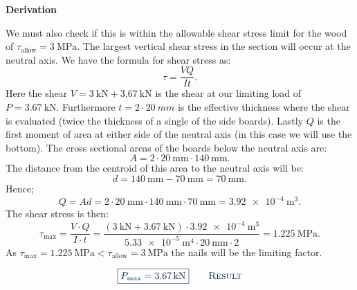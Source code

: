 \documentclass[a4paper]{article}
\numberwithin{equation}{problem}
\newcommand{\AUheading}[1]{%
  \par\vspace{.4\baselineskip}%
  {\sffamily\bfseries\color{AUblueDark}#1\par}%
  \nobreak%
}
\newenvironment{derivation}[1][Derivation]{%
  \AUheading{#1}
  \begingroup\allowdisplaybreaks
  \setlength{\abovedisplayskip}{6pt}%
  \setlength{\belowdisplayskip}{6pt}%
  \setlength{\abovedisplayshortskip}{4pt}%
  \setlength{\belowdisplayshortskip}{4pt}%
}{\par\endgroup\medskip}
\newcommand{\finalresult}[1]{%
  \vspace{.2\baselineskip}%
  \begin{equation}
    {\color{AUblueDark}\boxed{\displaystyle #1}}
    \tag*{\textsc{\textcolor{AUblueDark}{Result}}}
  \end{equation}
  \newpage
}
\begin{document}
\begin{derivation}
  We must also check if this is within the allowable shear stress limit for the wood of $\tau_{\text{allow}} = \qty{3}{\MPa}$.
  The largest vertical shear stress in the section will occur at the neutral axis.
  We have the formula for shear stress as:
  \begin{equation*}
    \tau = \frac{VQ}{I t}
  .\end{equation*}
  Here the shear $V = \qty{3}{\kN} + \qty{3,67}{\kN}$ is the shear at our limiting load of $P = \qty{3,67}{\kN}$.
  Furthermore $t = 2 \cdot \qty{20}{mm} $ is the effective thickness where the shear is evaluated (twice the thickness of a single of the side boards).
  Lastly $Q$ is the first moment of area at either side of the neutral axis (in this case we will use the bottom).
  The cross sectional areas of the boards below the neutral axis are:
  \begin{equation*}
    A = 2 \cdot \qty{20}{\mm} \cdot \qty{140}{\mm}
  .\end{equation*}
  The distance from the centroid of this area to the neutral axis will be:
  \begin{equation*}
    d = \qty{140}{\mm} - \qty{70}{\mm} = \qty{70}{\mm}
  .\end{equation*}
  Hence;
  \begin{equation*}
    Q = A d = 2 \cdot \qty{20}{\mm} \cdot \qty{140}{\mm} \cdot \qty{70}{\mm} = \qty{3,92e-4}{\m^3 } 
  .\end{equation*}
  The shear stress is then:
  \begin{equation*}
    \tau_{\mathrm{max}} = \frac{V \cdot Q}{I \cdot  t} = \frac{\left( \qty{3}{\kN} + \qty{3,67}{\kN} \right)\cdot \qty{3,92e-4}{\m^3}}{\qty{5,33e-5}{\m^{4}} \cdot \qty{20}{\mm} \cdot 2} = \qty{1,225}{\MPa} 
  .\end{equation*}
  As $\tau_{\mathrm{max}} = \qty{1,225}{\MPa} < \tau_{\text{allow}} = \qty{3}{\MPa}$ the nails will be the limiting factor.
\end{derivation}

\finalresult{
P_{\mathrm{max}} = \qty{3,67}{\kN}
}
\end{document}
